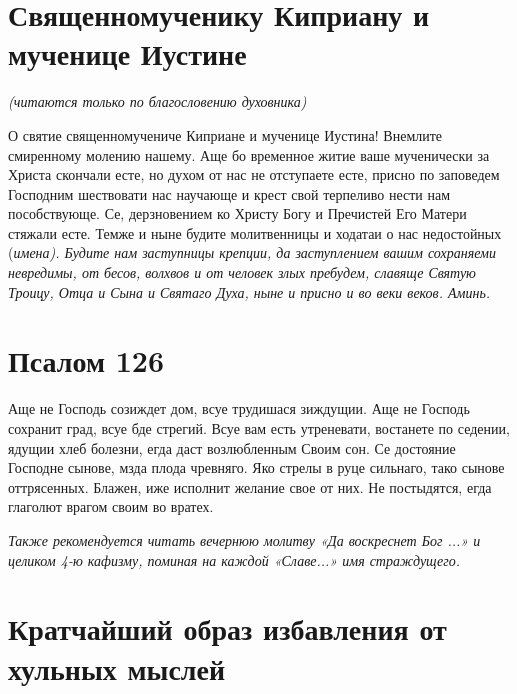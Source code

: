 \section{Священномученику Киприану и мученице Иустине}
 


\itshape (читаются только по благословению духовника)\normalfont{}




 О святие священномучениче Киприане и мученице Иустина! Внемлите смиренному молению нашему. Аще бо временное житие ваше мученически за Христа скончали есте, но духом от нас не отступаете есте, присно по заповедем Господним шествовати нас научающе и крест свой терпеливо нести нам пособствующе. Се, дерзновением ко Христу Богу и Пречистей Его Матери стяжали есте. Темже и ныне будите молитвенницы и ходатаи о нас недостойных (\itshape имена\normalfont{}). Будите нам заступницы крепции, да заступлением вашим сохраняеми невредимы, от бесов, волхвов и от человек злых пребудем, славяще Святую Троицу, Отца и Сына и Святаго Духа, ныне и присно и во веки веков. Аминь.


\section{Псалом 126}
 


Аще не Господь созиждет дом, всуе трудишася зиждущии. Аще не Господь сохранит град, всуе бде стрегий. Всуе вам есть утреневати, востанете по седении, ядущии хлеб болезни, егда даст возлюбленным Своим сон. Се достояние Господне сынове, мзда плода чревняго. Яко стрелы в руце сильнаго, тако сынове оттрясенных. Блажен, иже исполнит желание свое от них. Не постыдятся, егда глаголют врагом своим во вратех.

\itshape Также рекомендуется читать вечернюю молитву  «Да воскреснет Бог ...» и целиком 4-ю кафизму, поминая на каждой «Славе...» имя страждущего.

\normalfont{} 
\mychapterending


 

\section{Кратчайший образ избавления от хульных мыслей}
 




